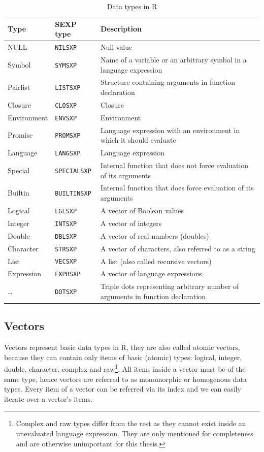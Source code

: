 \documentclass[thesis=B,english]{FITthesis}[2012/10/20]
\begin{document}
\begin{table}
	\caption[Data types in R]{Data types in R}\label{tab:types}
	\begin{tabularx}{1\textwidth}{|l|l|X|}\hline
		Type		& SEXP type		& Description \tabularnewline \hline \hline
		NULL		& \verb|NILSXP|		& Null value  \tabularnewline \hline
		Symbol	& \verb|SYMSXP|	& Name of a variable or an arbitrary symbol in a language expression  \tabularnewline \hline
		Pairlist	& \verb|LISTSXP|	& Structure containing arguments in function declaration \tabularnewline \hline
		Closure	& \verb|CLOSXP|	& Closure  \tabularnewline \hline
		Environment	& \verb|ENVSXP|	& Environment  \tabularnewline \hline
		Promise	& \verb|PROMSXP|	& Language expression with an environment in which it should evaluate \tabularnewline \hline
		Language	& \verb|LANGSXP|	& Language expression  \tabularnewline \hline
		Special	& \verb|SPECIALSXP|	& Internal function that does not force evaluation of its arguments \tabularnewline \hline
		Builtin	& \verb|BUILTINSXP|	& Internal function that does force evaluation of its arguments \tabularnewline \hline
		Logical	& \verb|LGLSXP|	& A vector of Boolean values \tabularnewline \hline
		Integer	& \verb|INTSXP|	& A vector of integers  \tabularnewline \hline
		Double	& \verb|DBLSXP|	& A vector of real numbers (doubles)  \tabularnewline \hline
		Character & \verb|STRSXP| & A vector of characters, also referred to as a string \tabularnewline \hline
		List	& \verb|VECSXP|	& A list (also called recursive vectors)  \tabularnewline \hline
		Expression	& \verb|EXPRSXP|	& A vector of language expressions  \tabularnewline \hline
		\ldots	& \verb|DOTSXP|	& Triple dots representing arbitrary number of arguments in function declaration  \tabularnewline \hline		
	\end{tabularx}
\end{table}

\subsection{Vectors}
Vectors represent basic data types in R, they are also called atomic vectors, because they can contain only items of basic (atomic) types: logical, integer, double, character, complex and raw\footnote{Complex and raw types differ from the rest as they cannot exist inside an unevaluated language expression. They are only mentioned for completeness and are otherwise unimportant for this thesis.}. All items inside a vector must be of the same type, hence vectors are referred to as monomorphic or homogenous data types. Every item of a vector can be referred via its index and we can easily iterate over a vector’s items.
\end{document}
